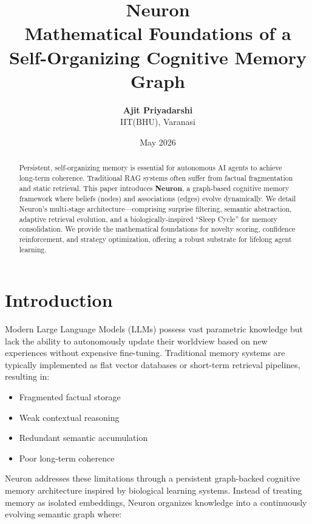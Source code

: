 \documentclass[11pt,a4paper]{article}
\title{%
    \vspace{-1.5cm}
    \textbf{\Huge Neuron}\\[0.4cm]
    \Large Mathematical Foundations of a Self-Organizing Cognitive Memory Graph
}
\author{%
    \textbf{Ajit Priyadarshi}\\
    \small IIT(BHU), Varanasi
}
\date{May 2026}
\begin{document}
\maketitle
\vspace{-0.6cm}

\begin{abstract}
Persistent, self-organizing memory is essential for autonomous AI agents to achieve long-term coherence. Traditional RAG systems often suffer from factual fragmentation and static retrieval. This paper introduces \textbf{Neuron}, a graph-based cognitive memory framework where beliefs (nodes) and associations (edges) evolve dynamically. We detail Neuron's multi-stage architecture—comprising surprise filtering, semantic abstraction, adaptive retrieval evolution, and a biologically-inspired ``Sleep Cycle'' for memory consolidation. We provide the mathematical foundations for novelty scoring, confidence reinforcement, and strategy optimization, offering a robust substrate for lifelong agent learning.
\end{abstract}

\vspace{0.4cm}

\section{Introduction}

Modern Large Language Models (LLMs) possess vast parametric knowledge but lack the
ability to autonomously update their worldview based on new experiences without
expensive fine-tuning. Traditional memory systems are typically implemented as flat
vector databases or short-term retrieval pipelines, resulting in:

\begin{itemize}
    \item Fragmented factual storage
    \item Weak contextual reasoning
    \item Redundant semantic accumulation
    \item Poor long-term coherence
\end{itemize}

Neuron addresses these limitations through a persistent graph-backed cognitive memory
architecture inspired by biological learning systems. Instead of treating memory as
isolated embeddings, Neuron organizes knowledge into a continuously evolving semantic
graph where:
\end{document}
